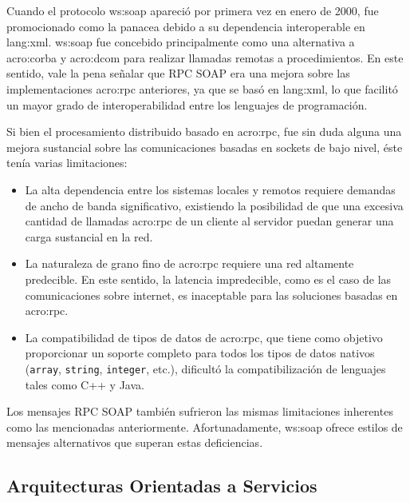 Cuando el protocolo \gls{ws:soap} apareció por primera vez en enero de 2000, fue promocionado como la panacea debido a su dependencia interoperable en \gls{lang:xml}. \gls{ws:soap} fue concebido principalmente como una alternativa a \gls{acro:corba} y \gls{acro:dcom} para realizar llamadas remotas a procedimientos. En este sentido, vale la pena señalar que RPC SOAP era una mejora sobre las implementaciones \gls{acro:rpc} anteriores, ya que se basó en \gls{lang:xml}, lo que facilitó un mayor grado de interoperabilidad entre los lenguajes de programación.

Si bien el procesamiento distribuido basado en \gls{acro:rpc}, fue sin duda alguna una mejora sustancial sobre las comunicaciones basadas en sockets de bajo nivel, éste tenía varias limitaciones\cite[p.~6]{opensourcesoa:davis}:

\begin{itemize}
  \item La alta dependencia entre los sistemas locales y remotos requiere demandas de ancho de banda significativo, existiendo la posibilidad de que una excesiva cantidad de llamadas \gls{acro:rpc} de un cliente al servidor puedan generar una carga sustancial en la red.
  \item La naturaleza de grano fino de \gls{acro:rpc} requiere una red altamente predecible. En este sentido, la latencia impredecible, como es el caso de las comunicaciones sobre internet, es inaceptable para las soluciones basadas en \gls{acro:rpc}.
  \item La compatibilidad de tipos de datos de \gls{acro:rpc}, que tiene como objetivo proporcionar un soporte completo para todos los tipos de datos nativos (\texttt{array}, \texttt{string}, \texttt{integer}, etc.), dificultó la compatibilización de lenguajes tales como C++ y Java.
\end{itemize}

Los mensajes RPC SOAP también sufrieron las mismas limitaciones inherentes como las mencionadas anteriormente. Afortunadamente, \gls{ws:soap} ofrece estilos de mensajes alternativos que superan estas deficiencias.


\subsection{Arquitecturas Orientadas a Servicios}
\label{soa:definicion}

